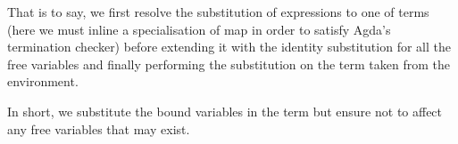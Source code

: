 That is to say, we first resolve the substitution of expressions to one of
terms (here we must inline a specialisation of map in order to satisfy Agda's
termination checker) before extending it with the identity substitution for
all the free variables and finally performing the substitution on the term
taken from the environment.

In short, we substitute the bound variables in the term but ensure not to
affect any free variables that may exist.

